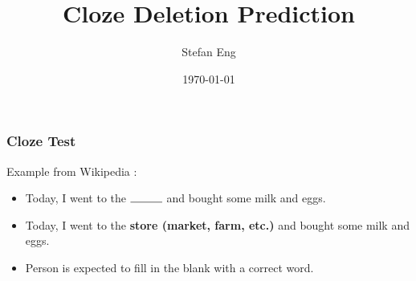 \documentclass{beamer}
\title[Cloze Prediction]{Cloze Deletion Prediction} %
\author{Stefan Eng} %
\institute[] %
{
Göteborgs universitet \\ %
\medskip
\textit{gussteen@student.gu.se} %
}
\date{\today} %
\begin{document}
\begin{frame}
\titlepage %
\end{frame}

\begin{frame}
\frametitle{Cloze Test} %
Example from Wikipedia \cite{wikipedia}: 
\begin{itemize}
    \item <1> Today, I went to the $\rule{1cm}{0.15mm}$ and bought some milk and eggs.
    \item <2-> Today, I went to the \textbf{store (market, farm, etc.)} and bought some milk and eggs.
    \item <3-> Person is expected to fill in the blank with a correct word.
\end{itemize}
\end{frame}



\end{document}

